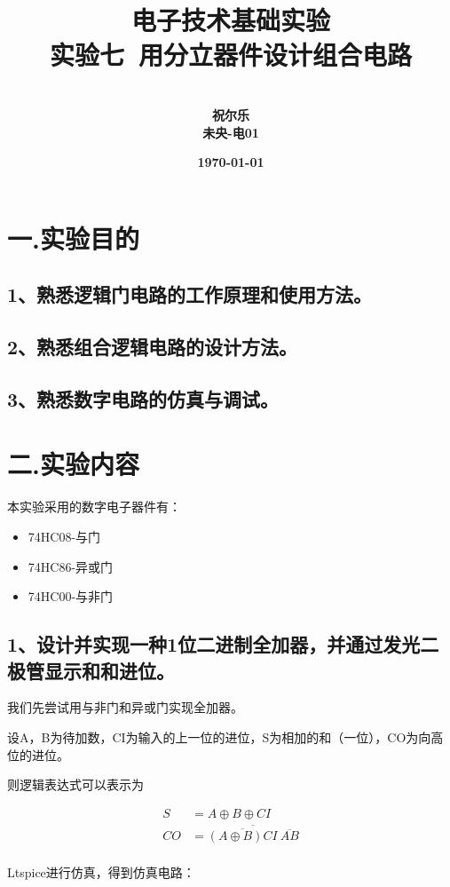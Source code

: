 \documentclass[UTF8]{ctexart}
\title{{电子技术基础实验} \\ \textbf{实验七\ 用分立器件设计组合电路}}
\author{\\\textbf{祝尔乐}
        \\\textbf{未央-电01}
        }
\date{\textbf{\today}}
\begin{document}
\maketitle

\section*{一.实验目的}

\subsection*{1、熟悉逻辑门电路的工作原理和使用方法。}
\subsection*{2、熟悉组合逻辑电路的设计方法。}
\subsection*{3、熟悉数字电路的仿真与调试。}

\section*{二.实验内容}

本实验采用的数字电子器件有：
\begin{itemize}
    \item 74HC08-与门
    \item 74HC86-异或门 
    \item 74HC00-与非门
\end{itemize}

\subsection*{1、设计并实现一种1位二进制全加器，并通过发光二极管显示和和进位。}

我们先尝试用与非门和异或门实现全加器。

设A，B为待加数，CI为输入的上一位的进位，S为相加的和（一位），CO为向高位的进位。

则逻辑表达式可以表示为

\begin{align*}
    S &= A \oplus B \oplus CI\\
    CO &= \overline{ \overline{(A \oplus B)CI}\ \overline{AB} }\\ 
\end{align*}

Ltspice进行仿真，得到仿真电路：
\end{document}
